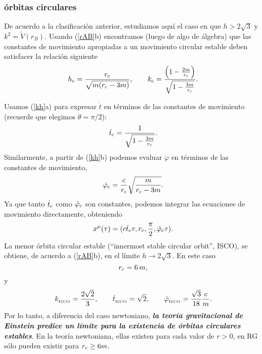 \subsubsection{órbitas circulares}
De acuerdo a la clasificación anterior, estudiamos aquí el caso en que $h>2\sqrt{3}$ y $k^2=\tilde{V}(r_B)$. Usando (\ref{rAB}b) encontramos (luego de algo de álgebra) que las constantes de movimiento apropiadas a un movimiento circular estable deben satisfacer la relación siguiente
\begin{equation}
h_{\rm c}=\frac{r_{\rm c}}{\sqrt{m(r_{\rm c}-3m)}}, \qquad  k_{\rm c}=\frac{\left(1-\frac{2m}{r_{\rm c}}\right)}{\sqrt{1-\frac{3m}{r_{\rm c}}}}.
\end{equation}

Usamos (\ref{kh}a)  para expresar $\dot{t}$ en términos de las constantes de movimiento (recuerde que elegimos $\theta=\pi/2$):
\begin{equation}
 \dot{t}_{\rm c}=\frac{1}{\sqrt{1-\frac{3m}{r_{\rm c}}}}.
\end{equation}
Similarmente, a partir de (\ref{kh}b) podemos evaluar $\dot\varphi$ en términos de las constantes de movimiento,
\begin{equation}
 \dot\varphi_{\rm c}=\frac{c}{r_{\rm c}}\sqrt{\frac{m}{r_{\rm c}-3m}}.
\end{equation}
Ya que tanto $ \dot{t}_{\rm c}$ como $ \dot\varphi_{\rm c}$ son constantes, podemos integrar las ecuaciones de movimiento directamente, obteniendo
\begin{equation}
 x^\mu(\tau)=(c\dot{t}_{\rm c}\tau,r_{\rm c},\frac{\pi}{2}, \dot\varphi_{\rm c}\tau).
\end{equation}
La menor órbita circular estable (``innermost stable circular orbit'', ISCO), se obtiene, de acuerdo a (\ref{rAB}b), en el límite $h\to 2\sqrt{3}$. En este caso
\begin{equation}
 r_{\rm c}=6\,m,
\end{equation}
y
\begin{equation}
 k_{_{\rm ISCO}}= \frac{2\sqrt{2}}{3}, \qquad \dot{t}_{_{\rm ISCO}}=\sqrt{2}, \qquad \dot\varphi_{_{\rm ISCO}}=\frac{\sqrt{3}}{18}\frac{c}{m}.
\end{equation}
Por lo tanto, a diferencia del caso newtoniano, \textbf{\textit{la teoría gravitacional de Einstein predice un límite para la existencia de órbitas circulares estables}}. En la teoría newtoniana, ellas existen para cada valor de $r>0$, en RG sólo pueden existir para $r_{\rm c}\ge6m$.

